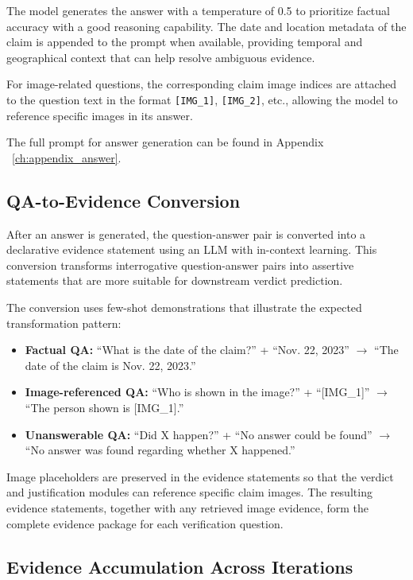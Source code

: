 The model generates the answer with a temperature of 0.5 to prioritize factual accuracy with a good reasoning capability. The date and location metadata of the claim is appended to the prompt when available, providing temporal and geographical context that can help resolve ambiguous evidence.

For image-related questions, the corresponding claim image indices are attached to the question text in the format \texttt{[IMG\_1]}, \texttt{[IMG\_2]}, etc., allowing the model to reference specific images in its answer.

The full prompt for answer generation can be found in Appendix ~\ref{ch:appendix_answer}.

\subsection{QA-to-Evidence Conversion}
\label{qa_evidence_conversion}

After an answer is generated, the question-answer pair is converted into a declarative evidence statement using an LLM with in-context learning. This conversion transforms interrogative question-answer pairs into assertive statements that are more suitable for downstream verdict prediction.

The conversion uses few-shot demonstrations that illustrate the expected transformation pattern:

\begin{itemize}
    \item \textbf{Factual QA:} ``What is the date of the claim?'' + ``Nov. 22, 2023'' $\rightarrow$ ``The date of the claim is Nov. 22, 2023.''
    \item \textbf{Image-referenced QA:} ``Who is shown in the image?'' + ``[IMG\_1]'' $\rightarrow$ ``The person shown is [IMG\_1].''
    \item \textbf{Unanswerable QA:} ``Did X happen?'' + ``No answer could be found'' $\rightarrow$ ``No answer was found regarding whether X happened.''
\end{itemize}

Image placeholders are preserved in the evidence statements so that the verdict and justification modules can reference specific claim images. The resulting evidence statements, together with any retrieved image evidence, form the complete evidence package for each verification question.

\subsection{Evidence Accumulation Across Iterations}

